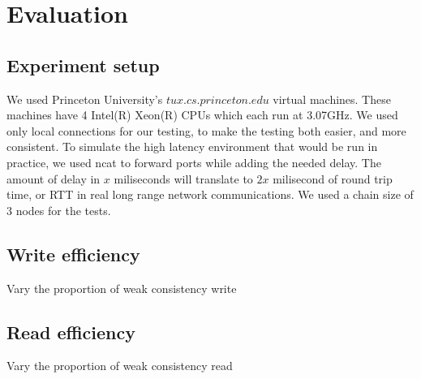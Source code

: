 \section{Evaluation}
\label{sec:eval}

\subsection{Experiment setup}
We used Princeton University's $tux.cs.princeton.edu$ virtual machines.
These machines have 4 Intel(R) Xeon(R) CPUs which each run at 3.07GHz.
We used only local connections for our testing, to make the testing both easier, and more consistent.
To simulate the high latency environment that would be run in practice,
we used ncat to forward ports while adding the needed delay. The amount of delay in $x$ miliseconds will
translate to $2x$ milisecond of round trip time, or RTT in real long range network communications.
We used a chain size of 3 nodes for the tests.


\subsection{Write efficiency}
Vary the proportion of weak consistency write



\subsection{Read efficiency}
Vary the proportion of weak consistency read



